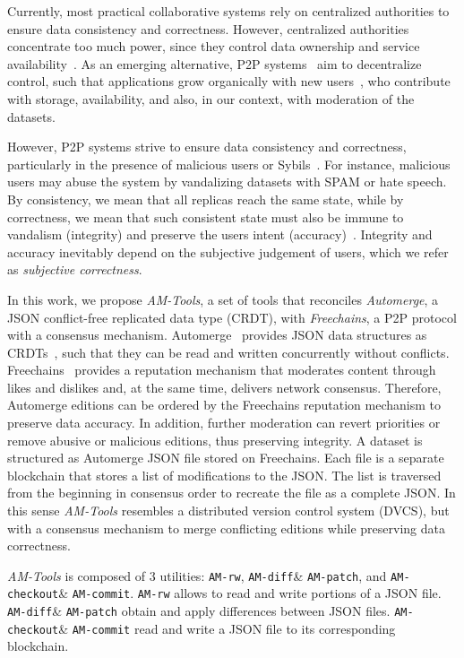 \documentclass[12pt]{article}
\newcommand{\AMT}      {\emph{AM-Tools}\xspace}
\newcommand{\amrw}       {\texttt{AM-rw}\xspace}
\newcommand{\amdiff}     {\texttt{AM-diff}\xspace}
\newcommand{\ampatch}    {\texttt{AM-patch}\xspace}
\newcommand{\amcheckout} {\texttt{AM-checkout}\xspace}
\newcommand{\amcommit}   {\texttt{AM-commit}\xspace}
\begin{document}
Currently, most practical collaborative systems rely on centralized authorities
to ensure data consistency and correctness.
However, centralized authorities concentrate too much power, since they control
data ownership and service availability~\cite{pincheira2022decentralized}.
As an emerging alternative, P2P systems~\cite{androutsellis2004survey} aim to
decentralize control, such that applications grow organically with new
users~\cite{rodrigues2010peer}, who contribute with storage, availability, and
also, in our context, with moderation of the datasets.

However, P2P systems strive to ensure data consistency and correctness,
particularly in the presence of malicious users or
Sybils~\cite{douceur2002sybil}.
For instance, malicious users may abuse the system by vandalizing datasets with
SPAM or hate speech.
By consistency, we mean that all replicas reach the same state, while by
correctness, we mean that such consistent state must also be immune to
vandalism (integrity) and preserve the users intent
(accuracy)~\cite{litt2022peritext}.
Integrity and accuracy inevitably depend on the subjective judgement of users,
which we refer as \emph{subjective correctness}.

In this work, we propose \AMT, a set of tools that reconciles \emph{Automerge},
a JSON conflict-free replicated data type (CRDT), with \emph{Freechains}, a P2P
protocol with a consensus mechanism.
%
Automerge~\cite{p2p.automerge} provides JSON data structures as
CRDTs~\cite{p2p.crdts}, such that they can be read and written concurrently
without conflicts.
%
Freechains~\cite{fcs.sbseg20} provides a reputation mechanism that
moderates content through likes and dislikes and, at the same time, delivers
network consensus.
%
Therefore, Automerge editions can be ordered by the Freechains reputation
mechanism to preserve data accuracy.
In addition, further moderation can revert priorities or remove abusive or
malicious editions, thus preserving integrity.
%
A dataset is structured as Automerge JSON file stored on Freechains.
Each file is a separate blockchain that stores a list of modifications to the
JSON.
The list is traversed from the beginning in consensus order to recreate the
file as a complete JSON.
%
In this sense \AMT resembles a distributed version control system (DVCS), but
with a consensus mechanism to merge conflicting editions while
preserving data correctness.

\AMT is composed of 3 utilities:
    \amrw,
    \amdiff \& \ampatch, and
    \amcheckout \& \amcommit.
%
\amrw allows to read and write portions of a JSON file.
\amdiff \& \ampatch obtain and apply differences between JSON files.
\amcheckout \& \amcommit read and write a JSON file to its corresponding
blockchain.
\end{document}
